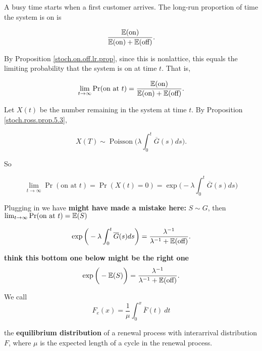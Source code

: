 \begin{solution} A busy time starts when a first customer arrives. The long-run proportion of time the system is on is

\[
\frac{\E(\text{on})}{\E(\text{on}) + \E(\text{off})}.
\]

By Proposition \ref{stoch.on.off.lr.prop}, since this is nonlattice, this equals the limiting probability that the system is on at time \(t\). That is, 


\[
\lim_{t \to \infty} \Pr(\text{on at } t) = \frac{\E(\text{on})}{\E(\text{on}) + \E(\text{off})}.
\]

Let \(X(t)\) be the number remaining in the system at time \(t\).  By Proposition \ref{stoch.ross.prop.5.3},

\[
X(T) \sim \operatorname{Poisson} \bigg (\lambda \int_0^t \overline{G}(s) ds \bigg).
\]

So

\[
\lim_{t \to \infty} \Pr(\text{on at } t) = \Pr(X(t) = 0) = \exp \bigg( - \lambda \int_0^t \overline{G}(s) ds\bigg) 
\]

Plugging in we have \textbf{might have made a mistake here:} \(S \sim G\), then \(
\lim_{t \to \infty} \Pr(\text{on at } t) =  \E(S) \)

\[
 \exp \bigg( - \lambda \int_0^t \overline{G}(s) ds\bigg) = \frac{\lambda^{-1}}{\lambda^{-1}+ \E(\text{off})}.
\]

\textbf{think this bottom one below might be the right one}
\[
 \exp \bigg( - \E(S) \bigg) = \frac{\lambda^{-1}}{\lambda^{-1}+ \E(\text{off})}.
\]

\end{solution}

\begin{definition} We call 
\[
F_e(x) = \frac{1}{\mu}  \int_0^x \overline{F}(t) \ dt
\]

the \textbf{equilibrium distribution} of a renewal process with interarrival distribution \(F\), where \(\mu\) is the expected length of a cycle in the renewal process.

\end{definition}

